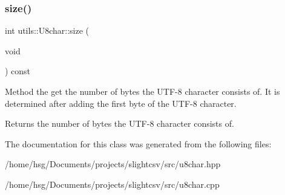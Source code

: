 \subsubsection{\texorpdfstring{size()}{size()}}
{\footnotesize\ttfamily int utils\+::\+U8char\+::size (\begin{DoxyParamCaption}\item[{void}]{ }\end{DoxyParamCaption}) const}

Method the get the number of bytes the U\+T\+F-\/8 character consists of. It is determined after adding the first byte of the U\+T\+F-\/8 character. \begin{DoxyReturn}{Returns}
the number of bytes the U\+T\+F-\/8 character consists of. 
\end{DoxyReturn}


The documentation for this class was generated from the following files\+:\begin{DoxyCompactItemize}
\item 
/home/hsg/\+Documents/projects/slightcsv/src/u8char.\+hpp\item 
/home/hsg/\+Documents/projects/slightcsv/src/u8char.\+cpp\end{DoxyCompactItemize}
